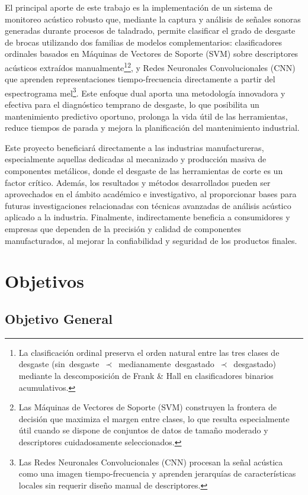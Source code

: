 \documentclass[12pt, letterpaper]{report}
\begin{document}
El principal aporte de este trabajo es la implementación de un sistema de monitoreo acústico robusto que, mediante la captura y análisis de señales sonoras generadas durante procesos de taladrado, permite clasificar el grado de desgaste de brocas utilizando dos familias de modelos complementarios: clasificadores ordinales basados en Máquinas de Vectores de Soporte (SVM) sobre descriptores acústicos extraídos manualmente\footnote{La clasificación ordinal preserva el orden natural entre las tres clases de desgaste (sin~desgaste~$\prec$~medianamente~desgastado~$\prec$~desgastado) mediante la descomposición de Frank \& Hall en clasificadores binarios acumulativos.}\footnote{Las Máquinas de Vectores de Soporte (SVM) construyen la frontera de decisión que maximiza el margen entre clases, lo que resulta especialmente útil cuando se dispone de conjuntos de datos de tamaño moderado y descriptores cuidadosamente seleccionados.}, y Redes Neuronales Convolucionales (CNN) que aprenden representaciones tiempo-frecuencia directamente a partir del espectrograma mel\footnote{Las Redes Neuronales Convolucionales (CNN) procesan la señal acústica como una imagen tiempo-frecuencia y aprenden jerarquías de características locales sin requerir diseño manual de descriptores.}. Este enfoque dual aporta una metodología innovadora y efectiva para el diagnóstico temprano de desgaste, lo que posibilita un mantenimiento predictivo oportuno, prolonga la vida útil de las herramientas, reduce tiempos de parada y mejora la planificación del mantenimiento industrial.

Este proyecto beneficiará directamente a las industrias manufactureras, especialmente aquellas dedicadas al mecanizado y producción masiva de componentes metálicos, donde el desgaste de las herramientas de corte es un factor crítico. Además, los resultados y métodos desarrollados pueden ser aprovechados en el ámbito académico e investigativo, al proporcionar bases para futuras investigaciones relacionadas con técnicas avanzadas de análisis acústico aplicado a la industria. Finalmente, indirectamente beneficia a consumidores y empresas que dependen de la precisión y calidad de componentes manufacturados, al mejorar la confiabilidad y seguridad de los productos finales.

\section{Objetivos}

\subsection{Objetivo General}
\end{document}
